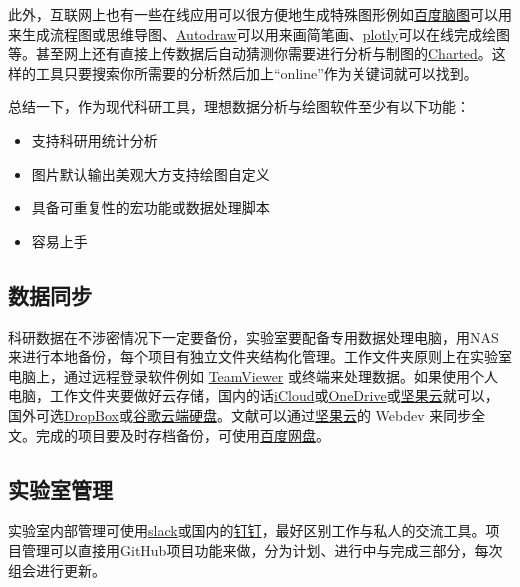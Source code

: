 \documentclass[]{tufte-book}
\providecommand{\tightlist}{%
  \setlength{\itemsep}{0pt}\setlength{\parskip}{0pt}}
\begin{document}
此外，互联网上也有一些在线应用可以很方便地生成特殊图形例如\href{http://naotu.baidu.com/}{百度脑图}可以用来生成流程图或思维导图、\href{https://www.autodraw.com/}{Autodraw}可以用来画简笔画、\href{https://plot.ly/}{plotly}可以在线完成绘图等。甚至网上还有直接上传数据后自动猜测你需要进行分析与制图的\href{https://www.charted.co/}{Charted}。这样的工具只要搜索你所需要的分析然后加上``online''作为关键词就可以找到。

总结一下，作为现代科研工具，理想数据分析与绘图软件至少有以下功能：

\begin{itemize}
\tightlist
\item
  支持科研用统计分析
\item
  图片默认输出美观大方支持绘图自定义
\item
  具备可重复性的宏功能或数据处理脚本
\item
  容易上手
\end{itemize}

\hypertarget{ux6570ux636eux540cux6b65}{%
\subsection*{数据同步}\label{ux6570ux636eux540cux6b65}}

科研数据在不涉密情况下一定要备份，实验室要配备专用数据处理电脑，用NAS来进行本地备份，每个项目有独立文件夹结构化管理。工作文件夹原则上在实验室电脑上，通过远程登录软件例如 \href{https://www.teamviewer.com/en-us/}{TeamViewer} 或终端来处理数据。如果使用个人电脑，工作文件夹要做好云存储，国内的话\href{https://www.icloud.com/}{iCloud}或\href{https://onedrive.live.com/about/en-us/}{OneDrive}或\href{https://www.jianguoyun.com/\#/}{坚果云}就可以，国外可选\href{https://www.dropbox.com/}{DropBox}或\href{https://drive.google.com/drive/my-drive}{谷歌云端硬盘}。文献可以通过\href{https://www.jianguoyun.com/\#/}{坚果云}的 Webdev 来同步全文。完成的项目要及时存档备份，可使用\href{https://pan.baidu.com/}{百度网盘}。

\hypertarget{ux5b9eux9a8cux5ba4ux7ba1ux7406}{%
\subsection*{实验室管理}\label{ux5b9eux9a8cux5ba4ux7ba1ux7406}}

实验室内部管理可使用\href{https://slack.com/}{slack}或国内的\href{https://www.dingtalk.com/}{钉钉}，最好区别工作与私人的交流工具。项目管理可以直接用GitHub项目功能来做，分为计划、进行中与完成三部分，每次组会进行更新。
\end{document}
